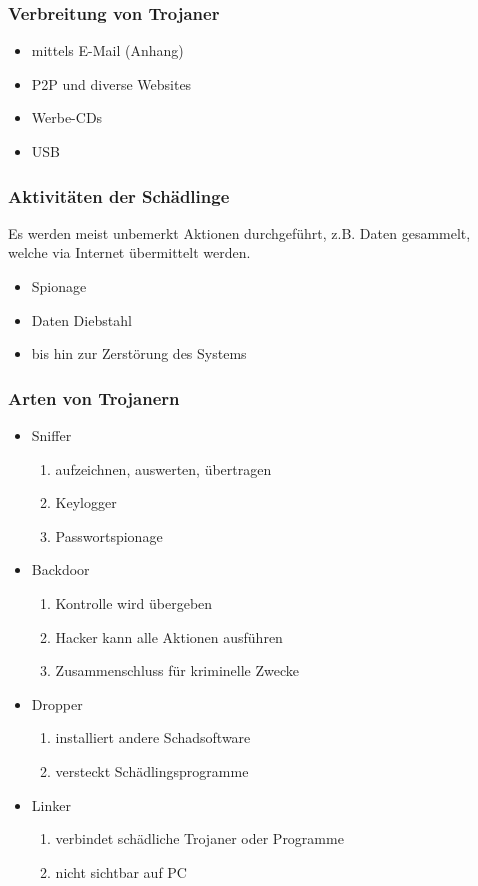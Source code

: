 \documentclass{beamer}
\begin{document}
\begin{frame}
	\frametitle{Verbreitung von Trojaner}
	\begin{itemize}
		\item mittels E-Mail (Anhang)
		\item P2P und diverse Websites
		\item Werbe-CDs
		\item USB
	\end{itemize}
\end{frame}


\begin{frame}
	\frametitle{Aktivitäten der Schädlinge}
	Es werden meist unbemerkt Aktionen durchgeführt, z.B. Daten gesammelt, welche via Internet übermittelt werden.
	\begin{itemize}
		\item Spionage
		\item Daten Diebstahl
		\item bis hin zur Zerstörung des Systems
	\end{itemize}
\end{frame}

\begin{frame}
	\frametitle{Arten von Trojanern}
	\begin{itemize}
		\item Sniffer
		\begin{enumerate}
			\item aufzeichnen, auswerten, übertragen
			\item Keylogger
			\item Passwortspionage 
		\end{enumerate}
		\item Backdoor
		\begin{enumerate}
			\item Kontrolle wird übergeben
			\item Hacker kann alle Aktionen ausführen
			\item Zusammenschluss für kriminelle Zwecke
		\end{enumerate}
		\item Dropper
		\begin{enumerate}
			\item installiert andere Schadsoftware
			\item versteckt Schädlingsprogramme 
		\end{enumerate}
		\item Linker
			\begin{enumerate}
				\item verbindet schädliche Trojaner oder Programme
				\item nicht sichtbar auf PC
			\end{enumerate}
	\end{itemize}
\end{frame}
\end{document}

